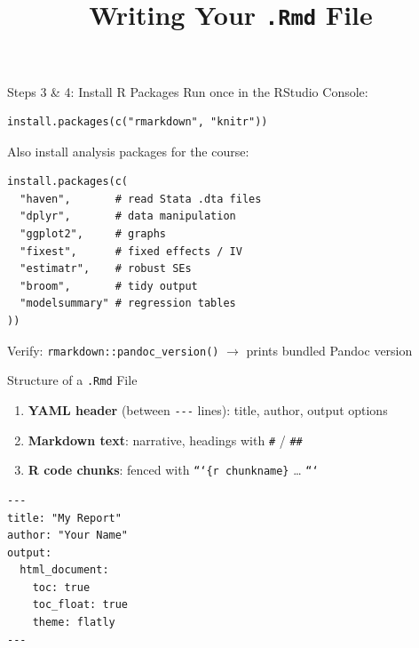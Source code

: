 \documentclass[dvipsnames,hyperref={pdfpagelabels=false}]{beamer}
\begin{document}
\begin{frame}[fragile]{Steps 3 \& 4: Install R Packages}
  Run once in the RStudio Console:
  \begin{lstlisting}[style=rslide]
install.packages(c("rmarkdown", "knitr"))
  \end{lstlisting}

  \vspace{0.5em}
  Also install analysis packages for the course:
  \begin{lstlisting}[style=rslide]
install.packages(c(
  "haven",       # read Stata .dta files
  "dplyr",       # data manipulation
  "ggplot2",     # graphs
  "fixest",      # fixed effects / IV
  "estimatr",    # robust SEs
  "broom",       # tidy output
  "modelsummary" # regression tables
))
  \end{lstlisting}

  \vspace{0.3em}
  Verify: \texttt{rmarkdown::pandoc\_version()} $\to$ prints bundled Pandoc version \checkmark
\end{frame}

\title[]{Writing Your \texttt{.Rmd} File}
\author{}\institute{}\date{}
\begin{frame}{}
  \titlepage
\end{frame}

\begin{frame}[fragile]{Structure of a \texttt{.Rmd} File}
  \begin{enumerate}
    \item \textbf{YAML header} (between \texttt{-{}-{}-} lines): title, author, output options
    \item \textbf{Markdown text}: narrative, headings with \texttt{\#} / \texttt{\#\#}
    \item \textbf{R code chunks}: fenced with \texttt{```\{r chunkname\}} \ldots{} \texttt{```}
  \end{enumerate}

  \vspace{0.5em}
  \begin{lstlisting}[language={},backgroundcolor=\color{gray!6}]
---
title: "My Report"
author: "Your Name"
output:
  html_document:
    toc: true
    toc_float: true
    theme: flatly
---
  \end{lstlisting}
\end{frame}
\end{document}

